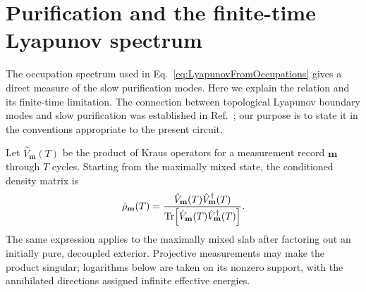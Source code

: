 \documentclass[aps,prb,10pt,twocolumn,superscriptaddress,longbibliography,floatfix]{revtex4-2}
\newcommand{\rec}{\mathbf m}   %
\begin{document}
\FloatBarrier
{\color{blue}
\section{Purification and the finite-time Lyapunov spectrum}
\label{app:Lyapunov}

The occupation spectrum used in Eq.~\eqref{eq:LyapunovFromOccupations} gives a direct measure of the slow purification modes. Here we explain the relation and its finite-time limitation. The connection between topological Lyapunov boundary modes and slow purification was established in Ref.~\cite{XiaoKawabata2026}; our purpose is to state it in the conventions appropriate to the present circuit.

Let $\hat V_{\rec}(T)$ be the product of Kraus operators for a measurement record $\rec$ through $T$ cycles. Starting from the maximally mixed state, the conditioned density matrix is
\begin{equation}
    \hat\rho_{\rec}(T)=
    \frac{\hat V_{\rec}(T)\hat V_{\rec}^\dagger(T)}
    {\Tr[\hat V_{\rec}(T)\hat V_{\rec}^\dagger(T)]}.
    \label{eq:PurificationKrausProduct}
\end{equation}
The same expression applies to the maximally mixed slab after factoring out an initially pure, decoupled exterior. Projective measurements may make the product singular; logarithms below are taken on its nonzero support, with the annihilated directions assigned infinite effective energies.

}
\end{document}
